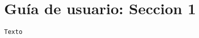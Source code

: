 \section{Gu\'ia de usuario: Seccion 1}
\label{Apendice2}

\begin{center}
\begin{footnotesize}

\begin{verbatim}
Texto
\end{verbatim}

\end{footnotesize}
\end{center}


%
%   
%   
%   
%   
%   
%   

